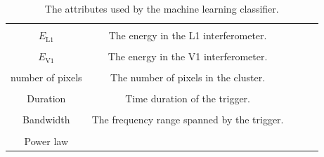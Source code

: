\documentclass[12pt,twoside,a4paper]{report}
\begin{document}
\begin{table}
\begin{tabular}{| c | c | c | c | c |}
\hline
& \\
$E_\text{L1}$& The energy in the L1 interferometer. \\

\hline
& \\
$E_\text{V1}$& The energy in the V1 interferometer. \\

\hline
& \\
number of pixels & The number of pixels in the cluster. \\

\hline
& \\
Duration & Time duration of the trigger. \\

\hline
& \\
Bandwidth & The frequency range spanned by the trigger. \\

\hline
& \\ 
Power law & \\

\hline
\hline
\end{tabular}
\caption{The attributes used by the machine learning classifier.}
\label{coherent energy table}
\end{table}

\FloatBarrier
\end{document}
